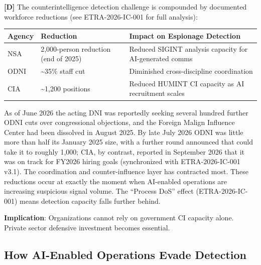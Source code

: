 \documentclass[11pt,letterpaper]{article}
\newcommand{\etraneed}[1]{\par\ifdim\pagegoal<\maxdimen\ifdim\pagetotal<\pagegoal\ifdim\dimexpr\pagegoal-\pagetotal\relax<\dimexpr#1\relax\newpage\fi\fi\fi}
\begin{document}
\begin{criticalbox}
\textbf{[D]} The counterintelligence detection challenge is compounded by documented workforce reductions (see ETRA-2026-IC-001 for full analysis):

\vspace{0.5em}
\begin{center}
\small
\begin{tabular}{L{2cm}L{4cm}L{6cm}}
\toprule
\textbf{Agency} & \textbf{Reduction} & \textbf{Impact on Espionage Detection} \\
\midrule
NSA & 2,000-person reduction (end of 2025) & Reduced SIGINT analysis capacity for AI-generated comms \\
ODNI & \textasciitilde{}35\% staff cut & Diminished cross-discipline coordination \\
CIA & \textasciitilde{}1,200 positions & Reduced HUMINT CI capacity as AI recruitment scales \\
\bottomrule
\end{tabular}
\end{center}

As of June 2026 the acting DNI was reportedly seeking several hundred further ODNI cuts over congressional objections, and the Foreign Malign Influence Center had been dissolved in August 2025. By late July 2026 ODNI was little more than half its January 2025 size, with a further round announced that could take it to roughly 1,000; CIA, by contrast, reported in September 2026 that it was on track for FY2026 hiring goals (synchronized with ETRA-2026-IC-001 v3.1). The coordination and counter-influence layer has contracted most. These reductions occur at exactly the moment when AI-enabled operations are increasing suspicious signal volume. The ``Process DoS'' effect (ETRA-2026-IC-001) means detection capacity falls further behind.

\textbf{Implication}: Organizations cannot rely on government CI capacity alone. Private sector defensive investment becomes essential.
\end{criticalbox}

\etraneed{12\baselineskip}
\subsection{How AI-Enabled Operations Evade Detection}
\end{document}
